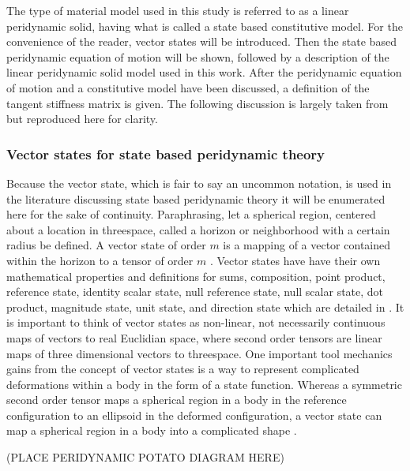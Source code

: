 \documentclass[preprint,12pt]{elsarticle}
\begin{document}
The type of material model used in this study is referred to as a linear
peridynamic solid, having what is called a state based constitutive model. For
the convenience of the reader, vector states will be introduced. Then the state
based peridynamic equation of motion will be shown, followed by a description
of the linear peridynamic solid model used in this work. After the peridynamic
equation of motion and a constitutive model have been discussed, a definition of
the tangent stiffness matrix is given. The following discussion is largely
taken from \cite{silling:psa} but reproduced here for clarity.

\subsubsection{Vector states for state based peridynamic theory}
Because the vector state, which is fair to say an uncommon notation, is used in the literature discussing state based peridynamic theory
it will be enumerated here for the sake of continuity. 
%
Paraphrasing, let a spherical region, centered about a
location in threespace, called a horizon or neighborhood with a certain radius
be defined. A vector state of order $m$ is a mapping of a vector contained
within the horizon to a tensor of order $m$ \cite{silling:psa}. Vector states
have have their own mathematical properties and definitions for sums, composition,
point product, reference state, identity scalar state, null reference state, null scalar state,
dot product, magnitude state, unit state, and direction state which are detailed in \cite{silling:psa}. 
It is important to think of vector states as non-linear, not necessarily continuous maps of vectors to real Euclidian space, where second order tensors are linear maps of three dimensional vectors to threespace. 
%
One important tool mechanics gains from the concept of vector states is a way
to represent complicated deformations within a body in the form of a state
function. Whereas a symmetric second order tensor maps a spherical region in a
body in the reference configuration to an ellipsoid in the deformed
configuration, a vector state can map a spherical region in a body into a
complicated shape \cite{silling:psa}.

(PLACE PERIDYNAMIC POTATO DIAGRAM HERE)
\end{document}
